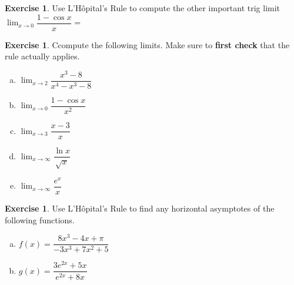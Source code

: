 \documentclass[11pt,reqno,final]{amsart}
\numberwithin{figure}{section}
\theoremstyle{definition} %
\newtheorem{exercise}[question]{Exercise}
\newcommand{\dlim}{\displaystyle\lim}
\begin{document}
\begin{exercise}
        Use L'H\^opital's Rule to compute the other important trig limit\\
        $ $\\
        $\dlim_{x \to 0} \dfrac{1 - \cos x}{x} = $
         
\end{exercise}

\newpage

\begin{exercise}
        Ccompute the following limits.
        Make sure to \textbf{first check} that the rule actually applies.
        \begin{enumerate}[(a)]
        \item $\dlim_{x \to 2} \dfrac{x^3 - 8}{x^4 - x^3 - 8}$
                \vfill
        \item $\dlim_{x \to 0} \dfrac{1 - \cos x}{x^2}$
                \vfill
        \item $\dlim_{x \to 3} \dfrac{x - 3}{x}$
                \vfill
        \item $\dlim_{x \to \infty} \dfrac{ \ln x}{\sqrt{x}}$
                \vfill
        \item $\dlim_{x \to \infty} \dfrac{e^x}{x}$
                \vfill
        \end{enumerate}
\end{exercise}

\begin{exercise}
        Use L'H\^opital's Rule to find any horizontal asymptotes of the following functions.
        \begin{enumerate}[(a)]
        \item $f(x) = \dfrac{8x^3 - 4x+\pi}{-3x^3 + 7x^2 + 5}$
                \vfill
        \item $g(x) = \dfrac{3e^{2x} + 5x}{e^{2x} + 8x}$
                \vfill
        \end{enumerate}
\end{exercise}
\end{document}
